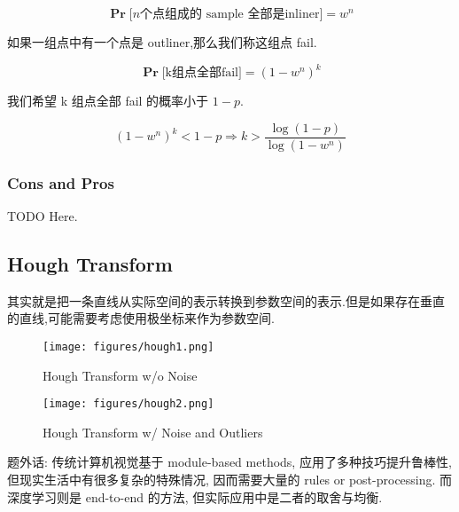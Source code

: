 \begin{equation}
\mathbf{\Pr}\text{[$n$个点组成的 sample 全部是inliner]} = w^n
\end{equation}

如果一组点中有一个点是 outliner,那么我们称这组点 fail.

\begin{equation}
\mathbf{\Pr}\text{[k组点全部fail]} = {(1-w^n)}^k
\end{equation}

我们希望 k 组点全部 fail 的概率小于 $1-p$.

\begin{equation}
{(1-w^{n})}^k < 1-p
\Rightarrow
k > \frac{\log(1-p)}{\log(1-w^n)}
\end{equation}

\subsubsection{Cons and Pros}
TODO Here.

\subsection{Hough Transform}
其实就是把一条直线从实际空间的表示转换到参数空间的表示.但是如果存在垂直的直线,可能需要考虑使用极坐标来作为参数空间.

\begin{figure}[htbp]
    \centering
    \texttt{[image: figures/hough1.png]}
    \caption{Hough Transform w/o Noise}
\end{figure}

\begin{figure}[htbp]
    \centering
    \texttt{[image: figures/hough2.png]}
    \caption{Hough Transform w/ Noise and Outliers}
\end{figure}

题外话: 传统计算机视觉基于 module-based methods, 应用了多种技巧提升鲁棒性, 但现实生活中有很多复杂的特殊情况, 
因而需要大量的 rules or post-processing. 而深度学习则是 end-to-end 的方法, 但实际应用中是二者的取舍与均衡.